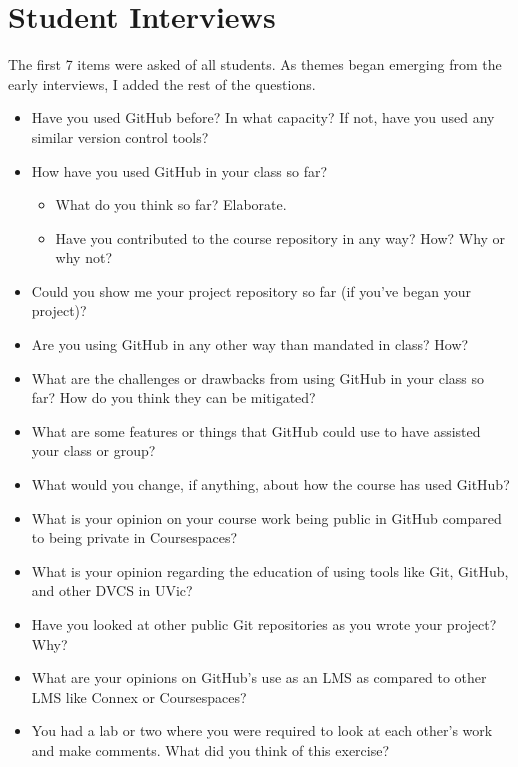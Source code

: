 \section{Student Interviews}
The first 7 items were asked of all students. As themes began emerging from the early interviews, I added the rest of the questions.
\begin{itemize}
    \item Have you used GitHub before? In what capacity? If not, have you used any similar version control tools?
    \item How have you used GitHub in your class so far?
    \begin{itemize}
        \item What do you think so far? Elaborate.
        \item Have you contributed to the course repository in any way? How? Why or why not?
    \end{itemize}
    \item Could you show me your project repository so far (if you've began your project)?
    \item Are you using GitHub in any other way than mandated in class? How?
    \item What are the challenges or drawbacks from using GitHub in your class so far? How do you think they can be mitigated?
    \item What are some features or things that GitHub could use to have assisted your class or group?
    \item What would you change, if anything, about how the course has used GitHub?
    \item What is your opinion on your course work being public in GitHub compared to being private in Coursespaces?
    \item What is your opinion regarding the education of using tools like Git, GitHub, and other DVCS in UVic?
    \item Have you looked at other public Git repositories as you wrote your project? Why?
    \item What are your opinions on GitHub's use as an LMS as compared to other LMS like Connex or Coursespaces?
    \item You had a lab or two where you were required to look at each other's work and make comments. What did you think of this exercise?
\end{itemize}

